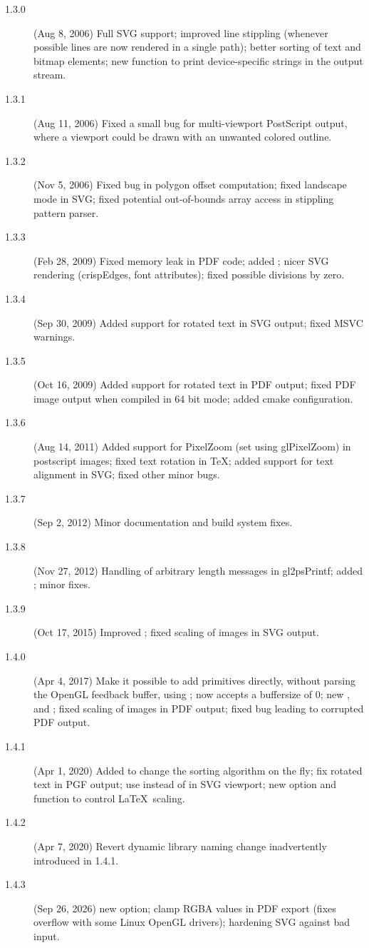 \begin{description}
\item[1.3.0] (Aug 8, 2006) Full SVG support; improved line stippling
  (whenever possible lines are now rendered in a single path); better
  sorting of text and bitmap elements; new function 
  to print device-specific strings in the output stream.
\item[1.3.1] (Aug 11, 2006) Fixed a small bug for multi-viewport
  PostScript output, where a viewport could be drawn with an unwanted
  colored outline.
\item[1.3.2] (Nov 5, 2006) Fixed bug in polygon offset computation;
  fixed landscape mode in SVG; fixed potential out-of-bounds array
  access in stippling pattern parser.
\item[1.3.3] (Feb 28, 2009) Fixed memory leak in PDF code; added
  ; nicer SVG rendering (crispEdges, font attributes);
  fixed possible divisions by zero.
\item[1.3.4] (Sep 30, 2009) Added support for rotated text in SVG output;
  fixed MSVC warnings.
\item[1.3.5] (Oct 16, 2009) Added support for rotated text in PDF output;
  fixed PDF image output when compiled in 64 bit mode; added cmake
  configuration.
\item[1.3.6] (Aug 14, 2011) Added support for PixelZoom (set using
  glPixelZoom) in postscript images; fixed text rotation in TeX; added
  support for text alignment in SVG; fixed other minor bugs.
\item[1.3.7] (Sep 2, 2012) Minor documentation and build system fixes.
\item[1.3.8] (Nov 27, 2012) Handling of arbitrary length messages in
  gl2psPrintf; added ; minor fixes.
\item[1.3.9] (Oct 17, 2015) Improved ; fixed scaling
  of images in SVG output.
\item[1.4.0] (Apr 4, 2017) Make it possible to add primitives directly, without
  parsing the OpenGL feedback buffer, using ;
   now accepts a buffersize of 0; new
  ,  and ; fixed
  scaling of images in PDF output; fixed bug leading to corrupted PDF output.
\item[1.4.1] (Apr 1, 2020) Added  to change the sorting
  algorithm on the fly; fix rotated text in PGF output; use  instead of
   in SVG viewport; new  option and
   function to control \LaTeX\ scaling.
\item[1.4.2] (Apr 7, 2020) Revert dynamic library naming change inadvertently
  introduced in 1.4.1.
\item[1.4.3] (Sep 26, 2026) new  option; clamp RGBA
  values in PDF export (fixes overflow with some Linux OpenGL drivers);
  hardening SVG against bad input.
\end{description}


